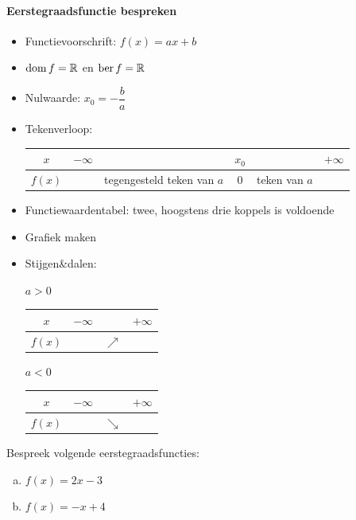 \documentclass[12pt,twoside,a4paper]{article}
\begin{document}
\paragraph*{Eerstegraadsfunctie bespreken}
\begin{mdframed}
  \begin{itemize}
  \item Functievoorschrift: $f(x)=ax + b$
  \item $\dom f = \mathbb{R}$ en $\ber f = \mathbb{R}$
  \item Nulwaarde: $x_0=-\dfrac{b}{a}$
  \item Tekenverloop:
    \begin{center}
      \begin{tabular}{c|lp{2.5cm}cp{1.5cm}r}
        $x$ & $-\infty$ & & $x_0$ & & $+\infty$\\
        \hline
        $f(x)$ & & tegengesteld teken van $a$ & 0 & teken van $a$ &
      \end{tabular}
    \end{center}
  \item Functiewaardentabel: twee, hoogstens drie koppels is voldoende
  \item Grafiek maken
  \item Stijgen\&dalen:\\
    \begin{minipage}{0.45\textwidth}
      \centering $a>0$\\
      \begin{tabular}{c|lcr}
        $x$ & $-\infty$ & & $+\infty$\\
        \hline
        $f(x)$ & & $\nearrow$ &
      \end{tabular}
    \end{minipage}
    \begin{minipage}{0.45\textwidth}
      \centering $a<0$\\
      \begin{tabular}{c|lcr}
        $x$ & $-\infty$ & & $+\infty$\\
        \hline
        $f(x)$ & & $\searrow$ &
      \end{tabular}
    \end{minipage}
  \end{itemize}
\end{mdframed}

\begin{oefening}
  Bespreek volgende eerstegraadsfuncties:
  \begin{enumerate}[(a)]
  \item $f(x)=2x-3$
  \item $f(x)=-x+4$
  \end{enumerate}
\end{oefening}
\end{document}
